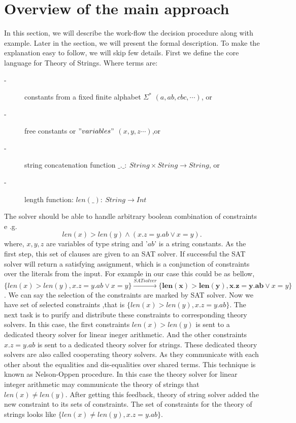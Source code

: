 
\section{Overview of the main approach}
\label{sec:overview}
In this section, we will describe the work-flow the decision procedure along with example.
Later in the section, we will present the formal description. To make the explanation easy to follow, we will skip few details.  
First we define the core language for Theory of Strings. Where terms are:
\begin{description}
	\item[-] constants from a fixed finite alphabet \( \Sigma^*\)   \( (a, ab,cbc,\cdots )\), or	
	\item[-] free constants or \("variables"\) \( (x, y,z\cdots )\),or	
	\item[-] string concatenation function \( \_.\_ : \ String \times String \to String  \), or
    \item[-] length function:  \( len(\_): \ String \to Int  \)
\end{description}
The solver should be able to handle arbitrary boolean combination of constraints e .g.
	\[       len(x) > len(y)  \wedge ( x.z = y.ab \vee x = y). \]
	where, \( x, y, z\) are variables of type string and  '\(ab\)' is a string constants. As the first step, this set of clauses are given to an SAT solver. If successful  the SAT solver will return a satisfying assignment, which is a conjunction of constraints over the literals from the input. For example in our case this could be as bellow, 
	\[     \{ len(x) > len(y) ,  x.z = y.ab \vee x = y \}\xrightarrow{SAT solver} \{ \mathbf{ len(x) > len(y)} ,  \mathbf{x.z = y.ab} \vee x = y \} \].
	We can say the selection of the constraints are marked by SAT solver. Now we have set of selected constraints ,that is \( \{ len(x) > len(y) ,  x.z = y.ab \}\). The next task is to purify and distribute these constraints to corresponding theory solvers. In this case, the first constraints \(len(x) > len(y)\) is sent to a dedicated theory solver for linear ineger arithmetic. And the other constraints \( x.z = y.ab \)  is sent to a dedicated theory solver for strings. These dedicated theory solvers are also called cooperating theory solvers. As they communicate with each other about the equalities and dis-equalities over shared terms. This technique is known as Nelson-Oppen procedure. In this case the theory solver for linear integer arithmetic may communicate the theory of strings that \(len(x) \neq len(y)\). After getting this feedback, theory of string solver added the new constraint to its sets of constraints. The set of constraints for the theory of strings looks like 
	\( \{ len(x) \neq len(y) ,  x.z = y.ab \}\).
	
